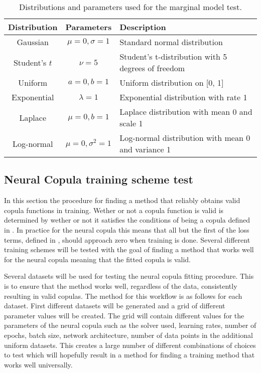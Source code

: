 \begin{table}[h]
    \centering
    \caption{Distributions and parameters used for the marginal model test.}
    \begin{tabular}{@{}ccl@{}}
        Distribution & Parameters & Description \\
        \toprule
        Gaussian & $\mu=0, \sigma=1$ & Standard normal distribution \\ 
        Student's $t$ & $\nu=5$ & Student's t-distribution with 5 degrees of freedom \\ 
        Uniform & $a=0, b=1$ & Uniform distribution on [0, 1] \\ 
        Exponential & $\lambda=1$ & Exponential distribution with rate 1 \\ 
        Laplace & $\mu=0, b=1$ & Laplace distribution with mean 0 and scale 1 \\ 
        Log-normal & $\mu=0, \sigma^2=1$ & Log-normal distribution with mean 0 and variance 1 \\ 
    \end{tabular}
    \label{tab:distributions}
\end{table}



\subsection{Neural Copula training scheme test}
In this section the procedure for finding a method that reliably obtains valid copula functions in training. Wether or not a copula function is valid is determined by wether or not it satisfies the conditions of being a copula defined in . In practice for the neural copula this means that all but the first of the loss terms, defined in , should approach zero when training is done. Several different training schemes will be tested with the goal of finding a method that works well for the neural copula meaning that the fitted copula is valid.

Several datasets will be used for testing the neural copula fitting procedure. This is to ensure that the method works well, regardless of the data, consistently resulting in valid copulas. The method for this workflow is as follows for each dataset. First different datasets will be generated  and a grid of different parameter values will be created. The grid will contain different values for the parameters of the neural copula such as the solver used, learning rates, number of epochs, batch size, network architecture, number of data points in the additional uniform datasets. This creates a large number of different combinations of choices to test which will hopefully result in a method for finding a training method that works well universally.  


